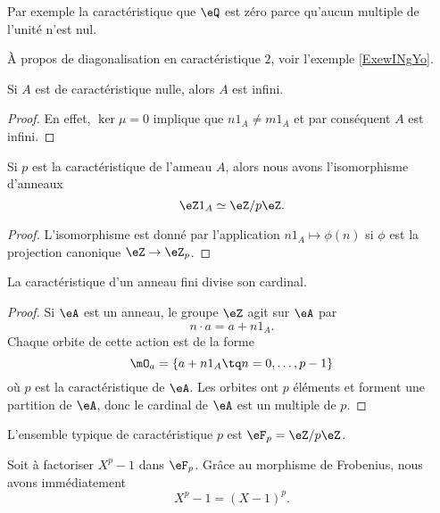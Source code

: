 Par exemple la caractéristique que \( \eQ\) est zéro parce qu'aucun multiple de l'unité n'est nul.

À propos de diagonalisation en caractéristique \( 2\), voir l'exemple \ref{ExewINgYo}.

\begin{lemma}
    Si \( A\) est de caractéristique nulle, alors \( A\) est infini.
\end{lemma}

\begin{proof}
    En effet, \( \ker\mu=0\) implique que \( n1_A\neq  m1_A\) et par conséquent \( A\) est infini.
\end{proof}

\begin{lemma}       \label{LemHmDaYH}
    Si \( p\) est la caractéristique de l'anneau \( A\), alors nous avons l'isomorphisme d'anneaux
    \begin{equation}
         \eZ 1_A\simeq\eZ/p\eZ.
    \end{equation}
\end{lemma}

\begin{proof}
    L'isomorphisme est donné par l'application \( n1_A\mapsto \phi(n)\) si \( \phi\) est la projection canonique \( \eZ\to \eZ_p\).
\end{proof}

\begin{proposition}     \label{PropGExaUK}
    La caractéristique d'un anneau fini divise son cardinal.
\end{proposition}

\begin{proof}
    Si \( \eA\) est un anneau, le groupe \( \eZ\) agit sur \( \eA\) par
    \begin{equation}
        n\cdot a=a+n1_A.
    \end{equation}
    Chaque orbite de cette action est de la forme
    \begin{equation}
        \mO_a=\{ a+n1_A\tq n=0,\ldots, p-1 \}
    \end{equation}
    où \( p\) est la caractéristique de \( \eA\). Les orbites ont \( p\) éléments et forment une partition de \( \eA\), donc le cardinal de \( \eA\) est un multiple de \( p\).
\end{proof}

L'ensemble typique de caractéristique \( p\) est \( \eF_p=\eZ/p\eZ\).

\begin{example}
    Soit à factoriser \( X^p-1\) dans \( \eF_p\). Grâce au morphisme de Frobenius, nous avons immédiatement
    \begin{equation}
        X^p-1=(X-1)^p.
    \end{equation}
\end{example}

